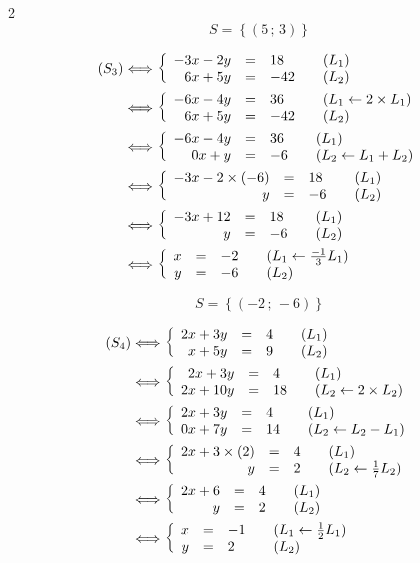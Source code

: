 \documentclass[10pt,a4paper,openany,twoside, eleve]{book}
\begin{document}
\begin{multicols}{2}
      $$S = \left\{ (5\,;\,3) \right\}$$

      \begin{align*}
         (S_3)
         &\Longleftrightarrow \left\{ \begin{array}{rcll} -3x - 2y &=& 18 &\quad (L_1) \\ 6x + 5y &=& -42 &\quad (L_2) \end{array} \right. \\
         &\Longleftrightarrow \left\{ \begin{array}{rcll} -6x - 4y &=& 36 &\quad (L_1 \leftarrow 2 \times L_1) \\ 6x + 5y &=& -42 &\quad (L_2) \end{array} \right. \\
         &\Longleftrightarrow \left\{ \begin{array}{rcll} -6x - 4y &=& 36 &\quad (L_1) \\ 0x + y &=& -6 &\quad (L_2 \leftarrow L_1 + L_2) \end{array} \right. \\
         &\Longleftrightarrow \left\{ \begin{array}{rcll} -3x - 2\times(-6) &=& 18 &\quad (L_1) \\ y &=& -6 &\quad (L_2) \end{array} \right. \\
         &\Longleftrightarrow \left\{ \begin{array}{rcll} -3x + 12 &=& 18 &\quad (L_1) \\ y &=& -6 &\quad (L_2) \end{array} \right. \\
         &\Longleftrightarrow \left\{ \begin{array}{rcll} x &=& -2 &\quad (L_1 \leftarrow \frac{-1}{3}L_1) \\ y &=& -6 &\quad (L_2) \end{array} \right.
         \end{align*}

         $$S = \left\{ (-2\,;\,-6) \right\}$$

         \begin{align*}
            (S_4)
            &\Longleftrightarrow \left\{ \begin{array}{rcll} 2x + 3y &=& 4 &\quad (L_1) \\ x + 5y &=& 9 &\quad (L_2) \end{array} \right. \\
            &\Longleftrightarrow \left\{ \begin{array}{rcll} 2x + 3y &=& 4 &\quad (L_1) \\ 2x + 10y &=& 18 &\quad (L_2 \leftarrow 2 \times L_2) \end{array} \right. \\
            &\Longleftrightarrow \left\{ \begin{array}{rcll} 2x + 3y &=& 4 &\quad (L_1) \\ 0x + 7y &=& 14 &\quad (L_2 \leftarrow L_2 - L_1) \end{array} \right. \\
            &\Longleftrightarrow \left\{ \begin{array}{rcll} 2x + 3\times(2) &=& 4 &\quad (L_1) \\ y &=& 2 &\quad (L_2 \leftarrow \frac{1}{7}L_2) \end{array} \right. \\
            &\Longleftrightarrow \left\{ \begin{array}{rcll} 2x + 6 &=& 4 &\quad (L_1) \\ y &=& 2 &\quad (L_2) \end{array} \right. \\
            &\Longleftrightarrow \left\{ \begin{array}{rcll} x &=& -1 &\quad (L_1 \leftarrow \frac12 L_1) \\ y &=& 2 &\quad (L_2) \end{array} \right.
            \end{align*}


\end{multicols}
\end{document}
